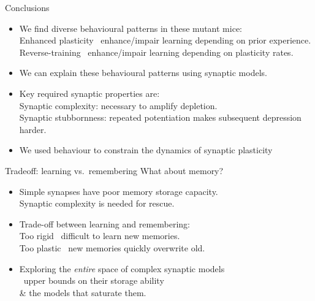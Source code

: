 \documentclass{beamer}%
\begin{document}
\begin{frame}{Conclusions}
%
 \begin{itemize}
   \item We find diverse behavioural patterns in these mutant mice:\\

   \alert{Enhanced plasticity \lto\ enhance/impair} learning depending on prior experience.\\
   \alert{Reverse-training \lto\ enhance/impair} learning depending on plasticity rates.

   \item We can explain these behavioural patterns using synaptic models.

   \item Key required synaptic properties are:\\
   \alert{Synaptic complexity:} necessary to amplify depletion.\\
   \alert{Synaptic stubbornness:} repeated potentiation makes subsequent depression harder.

   \item  We used behaviour to constrain the dynamics of synaptic plasticity
\end{itemize}
%
\end{frame}



\begin{frame}{Tradeoff: learning vs.\ remembering}
%
 What about memory?
 \begin{itemize}
   \vp\item Simple synapses have poor memory storage capacity. \\
   Synaptic complexity is needed for rescue.\\

   \vp\item Trade-off between learning and remembering:\\
   Too rigid \lto\ difficult to learn new memories.\\
   Too plastic \lto\ new memories quickly overwrite old.

   \vp\item Exploring the \emph{entire} space of complex synaptic models \\
   \lto\ upper bounds on their storage ability \\
   \& the models that saturate them.
 \end{itemize}

%
\end{frame}
\end{document}
